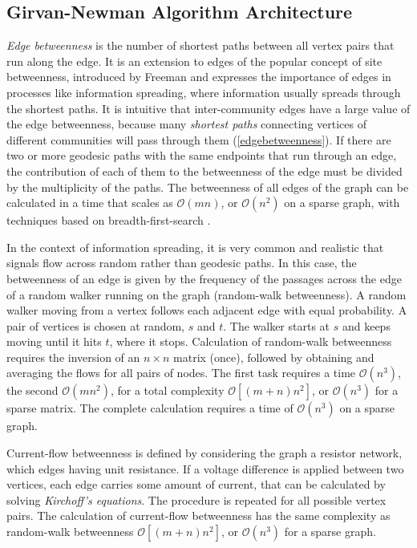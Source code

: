 \vfill
\pagebreak


\subsection{Girvan-Newman Algorithm Architecture}
\textit{Edge betweenness} is the number of shortest paths between all vertex pairs that run along the edge. It is an extension to edges of the popular concept of site betweenness, introduced by Freeman \cite{ref-11} and expresses the importance of edges in processes like information spreading, where information usually spreads through the shortest paths. It is intuitive that inter-community edges have a large value of the edge betweenness, because many \textit{shortest paths} connecting vertices of different communities will pass through them (\ref{edgebetweenness}). If there are two or more geodesic paths with the same endpoints that run through an edge, the contribution of each of them to the betweenness of the edge must be divided by the multiplicity of the paths. The betweenness of all edges of the graph can be calculated in a time that scales as $\mathcal{O}(mn)$, or $\mathcal{O}(n^2)$ on a sparse graph, with techniques based on breadth-first-search \cite{ref-12}.

In the context of information spreading, it is very common and realistic that signals flow across random rather than geodesic paths. In this case, the betweenness of an edge is given by the frequency of the passages across the edge of a random walker running on the graph (random-walk betweenness). A random walker moving from a vertex follows each adjacent edge with equal probability. A pair of vertices is chosen at random, $s$ and $t$. The walker starts at $s$ and keeps moving until it hits $t$, where it stops. Calculation of random-walk betweenness requires the inversion of an $n \times n$ matrix (once), followed by obtaining and averaging the flows for all pairs of nodes. The first task requires a time $\mathcal{O}(n^3)$, the second $\mathcal{O}(mn^2)$, for a total complexity $\mathcal{O}[(m + n)n^2]$, or $\mathcal{O}(n^3)$ for a sparse matrix. The complete calculation requires a time of $\mathcal{O}(n^3)$ on a sparse graph.

Current-flow betweenness is defined by considering the graph a resistor network, which edges having unit resistance. If a voltage difference is applied between two vertices, each edge carries some amount of current, that can be calculated by solving \textit{Kirchoff's equations}. The procedure is repeated for all possible vertex pairs. The calculation of current-flow betweenness has the same complexity as random-walk betweenness $\mathcal{O}[(m + n)n^2]$, or $\mathcal{O}(n^3)$ for a sparse graph.

